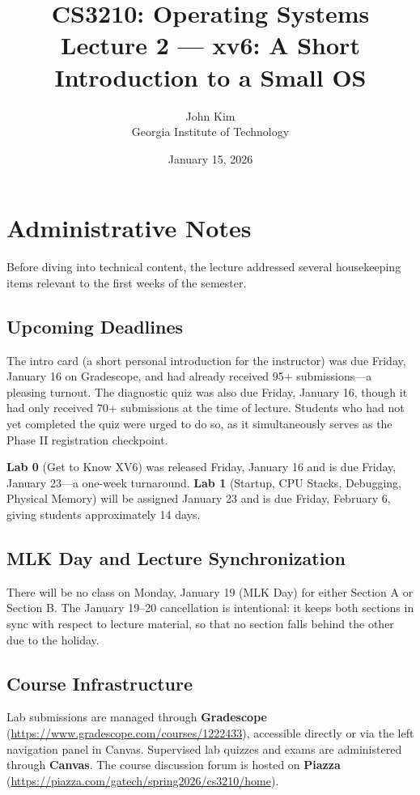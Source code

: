 \documentclass[11pt]{article}
\title{\textbf{CS3210: Operating Systems} \\ Lecture 2 --- xv6: A Short Introduction to a Small OS}
\author{John Kim \\ Georgia Institute of Technology}
\date{January 15, 2026}
\begin{document}
\maketitle
\tableofcontents
\newpage

\section{Administrative Notes}

Before diving into technical content, the lecture addressed several housekeeping items relevant to the first weeks of the semester.

\subsection{Upcoming Deadlines}

The intro card (a short personal introduction for the instructor) was due Friday, January 16 on Gradescope, and had already received 95+ submissions---a pleasing turnout. The diagnostic quiz was also due Friday, January 16, though it had only received 70+ submissions at the time of lecture. Students who had not yet completed the quiz were urged to do so, as it simultaneously serves as the Phase II registration checkpoint.

\textbf{Lab 0} (Get to Know XV6) was released Friday, January 16 and is due Friday, January 23---a one-week turnaround. \textbf{Lab 1} (Startup, CPU Stacks, Debugging, Physical Memory) will be assigned January 23 and is due Friday, February 6, giving students approximately 14 days.

\subsection{MLK Day and Lecture Synchronization}

There will be no class on Monday, January 19 (MLK Day) for either Section A or Section B. The January 19--20 cancellation is intentional: it keeps both sections in sync with respect to lecture material, so that no section falls behind the other due to the holiday.

\subsection{Course Infrastructure}

Lab submissions are managed through \textbf{Gradescope} (\url{https://www.gradescope.com/courses/1222433}), accessible directly or via the left navigation panel in Canvas. Supervised lab quizzes and exams are administered through \textbf{Canvas}. The course discussion forum is hosted on \textbf{Piazza} (\url{https://piazza.com/gatech/spring2026/cs3210/home}).
\end{document}
